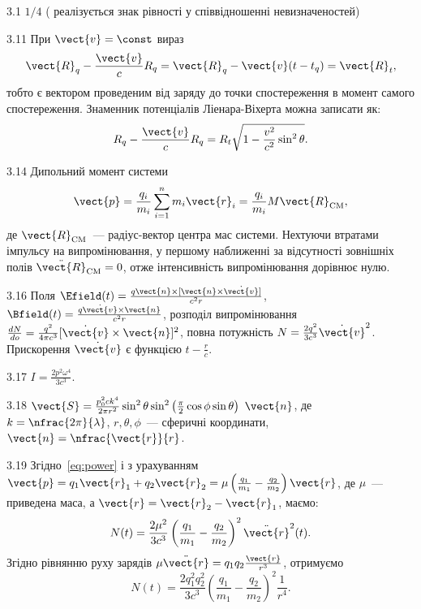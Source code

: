 \protect \section *{\protect {}}
\begin{Solution}{3.{1}}
	$1/4$ ( реалізується знак рівності у співвідношенні невизначеностей)
\end{Solution}
\begin{Solution}{3.{11}}
	При $\vect{v} = \const$  вираз
	\[
		\vect{R}_q - \frac{\vect{v}}{c} R_q = \vect{R}_q -\vect{v}(t - t_q) = \vect{R}_t,
	\]
	тобто є вектором проведеним від заряду до точки спостереження в момент самого спостереження.
	Знаменник потенціалів Ліенара-Віхерта можна записати як:
	\[
		R_q - \frac{\vect{v}}{c} R_q = R_t\sqrt{1-\frac{v^2}{c^2}\sin^2\theta}.
	\]
\end{Solution}
\begin{Solution}{3.{14}}
	Дипольний момент системи
	\[
		\vect{p} = \frac{q_i}{m_i} \sum\limits_{i = 1}^n m_i \vect{r}_i = \frac{q_i}{m_i} M\vect{R}_\mathrm{CM},
	\]
	де $\vect{R}_\mathrm{CM}$~--- радіус-вектор центра мас системи. Нехтуючи втратами імпульсу на випромінювання, у першому наближенні за відсутності зовнішніх полів $\ddot{\vect{R}}_\mathrm{CM} = 0$, отже інтенсивність випромінювання дорівнює нулю.
\end{Solution}
\begin{Solution}{3.{16}}
%
	Поля $\Efield(t) = \frac{q\vect{n}\times[ \vect{n} \times \dot{\vect{v}}] }{c^2r}$,
	$\Bfield(t) = \frac{q\dot{\vect{v}}\times\vect{n}}{c^2r}$,
	розподіл випромінювання $\frac{dN}{do} = \frac{q^2}{4\pi c^3}[\dot{\vect{v}}\times\vect{n}]^2$, повна потужність $N = \frac{2q^2}{3c^3}\dot{\vect{v}}^2$. Прискорення $ \dot{\vect{v}} $ є функцією $t - \frac{r}{c}$.
\end{Solution}
\begin{Solution}{3.{17}}
	$I = \frac{2p^2\omega^4}{3c^3}$.
\end{Solution}
\begin{Solution}{3.{18}}
	$\vect{S} = \frac{p_0^2ck^4}{2\pi r^2}\sin^2\theta\sin^2\left(\frac\pi2\cos\phi\sin\theta\right)\ \vect{n}$, де $k=\nfrac{2\pi}{\lambda}$, $r,\theta,\phi$~--- сферичні координати, $\vect{n} = \nfrac{\vect{r}}{r}$.
\end{Solution}
\begin{Solution}{3.{19}}
	Згідно~\eqref{eq:power} і з урахуванням $\vect{p} = q_1\vect{r}_1 + q_2\vect{r}_2 = \mu\left( \frac{q_1}{m_1}  - \frac{q_2}{m_2}\right)\vect{r} $, де $\mu$~--- приведена маса, а $\vect{r} = \vect{r}_2 - \vect{r}_1$, маємо:
	\[
		N(t) = \frac{2\mu^2}{3c^3}\left( \frac{q_1}{m_1}  - \frac{q_2}{m_2}\right)^2\ddot{\vect{r}}^2(t).
	\]
	Згідно рівнянню руху зарядів $\mu\ddot{\vect{r}} = {q_1q_2}\frac{\vect{r}}{r^3}$, отримуємо
	\[
		N(t) = \frac{2q_1^2q_2^2}{3c^3} \left( \frac{q_1}{m_1} - \frac{q_2}{m_2}\right)^2 \frac{1}{r^4}.
	\]
\end{Solution}
